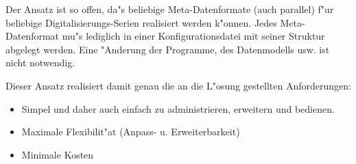 \documentclass[11pt, twoside, a4paper, BCOR8mm, DIV12, bibtotoc,idxtotoc]{scrreprt}
\begin{document}
Der Ansatz ist so offen, da"s beliebige Meta-Datenformate (auch
parallel) f"ur beliebige Digitalisie\-rungs-Serien realisiert werden
k"onnen. Jedes Meta-Datenformat mu"s lediglich in einer
Kon\-fi\-gu\-ra\-tions\-datei mit seiner Struktur abgelegt werden. Eine
"Anderung der Programme, des Datenmodells usw. ist nicht notwendig.

Dieser Ansatz realisiert damit genau die an die L"osung gestellten
Anforderungen:
\begin{itemize}
\item Simpel und daher auch einfach zu administrieren, erweitern und
  bedienen.
\item Maximale Flexibilit"at (Anpass- u. Erweiterbarkeit)
\item Minimale Kosten
\end{itemize}
\end{document}
